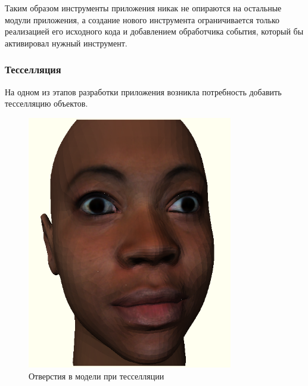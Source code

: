 \documentclass[12pt, a4paper]{article}
\begin{document}
Таким образом инструменты приложения никак не опираются на остальные
модули приложения, а создание нового инструмента ограничивается только
реализацией его исходного кода и добавлением обработчика события, который бы
активировал нужный инструмент.

\subsubsection{Тесселляция}

На одном из этапов разработки приложения возникла потребность добавить
тесселляцию объектов.

\begin{figure}[htb]
\centering
\includegraphics[width=0.8\textwidth]{holes-in-model.png}
\caption{Отверстия в модели при тесселляции}
\label{fig:holes-in-model}
\end{figure}
\end{document}
